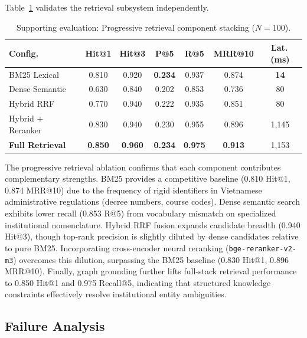 Table~\ref{tab:retrieval_evaluation} validates the retrieval subsystem independently.

\begin{table}[!htbp]
\centering
\caption{Supporting evaluation: Progressive retrieval component stacking ($N=100$).}
\label{tab:retrieval_evaluation}
{\small\setlength{\tabcolsep}{3pt}
\begin{tabular}{lcccccc}
\toprule
\textbf{Config.} & \textbf{Hit@1} & \textbf{Hit@3} & \textbf{P@5} & \textbf{R@5} & \textbf{MRR@10} & \textbf{Lat.\,(ms)} \\
\midrule
BM25 Lexical          & 0.810 & 0.920 & \textbf{0.234} & 0.937 & 0.874 & \textbf{14} \\
Dense Semantic        & 0.630 & 0.840 & 0.202 & 0.853 & 0.736 & 80 \\
Hybrid RRF            & 0.770 & 0.940 & 0.222 & 0.935 & 0.851 & 80 \\
Hybrid + Reranker     & 0.830 & 0.940 & 0.230 & 0.955 & 0.896 & 1{,}145 \\
\textbf{Full Retrieval} & \textbf{0.850} & \textbf{0.960} & \textbf{0.234} & \textbf{0.975} & \textbf{0.913} & 1{,}153 \\
\bottomrule
\end{tabular}}
\end{table}

The progressive retrieval ablation confirms that each component contributes complementary strengths. BM25 provides a competitive baseline (0.810 Hit@1, 0.874 MRR@10) due to the frequency of rigid identifiers in Vietnamese administrative regulations (decree numbers, course codes). Dense semantic search exhibits lower recall (0.853 R@5) from vocabulary mismatch on specialized institutional nomenclature. Hybrid RRF fusion expands candidate breadth (0.940 Hit@3), though top-rank precision is slightly diluted by dense candidates relative to pure BM25. Incorporating cross-encoder neural reranking (\texttt{bge-reranker-v2-m3}) overcomes this dilution, surpassing the BM25 baseline (0.830 Hit@1, 0.896 MRR@10). Finally, graph grounding further lifts full-stack retrieval performance to 0.850 Hit@1 and 0.975 Recall@5, indicating that structured knowledge constraints effectively resolve institutional entity ambiguities.

\subsection{Failure Analysis}
\label{sec:failure_analysis}

